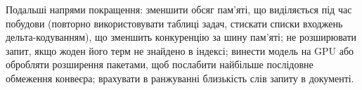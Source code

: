 Подальші напрями покращення: зменшити обсяг пам'яті, що виділяється під час побудови
(повторно використовувати таблиці задач, стискати списки входжень дельта-кодуванням), що
зменшить конкуренцію за шину пам'яті; не розширювати запит, якщо жоден його терм не знайдено
в індексі; винести модель на GPU або обробляти розширення пакетами, щоб послабити найбільше
послідовне обмеження конвеєра; врахувати в ранжуванні близькість слів запиту в документі.
